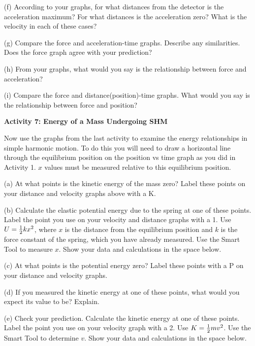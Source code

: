 (f) According to your graphs, for what distances from the detector is the acceleration
maximum? For what distances is the acceleration zero? What is the velocity in
each of these cases?
\vspace{20mm}

(g) Compare the force and acceleration-time graphs. Describe any similarities.
Does the force graph agree with your prediction?
\vspace{20mm}

(h) From your graphs, what would you say is the relationship between force and
acceleration? 
\vspace{20mm}

(i) Compare the force and distance(position)-time graphs. What would you say
is the relationship between force and position? 
\vspace{20mm}

\textbf{Activity 7: Energy of a Mass Undergoing SHM }

Now use the graphs from the last activity to examine the energy relationships
in simple harmonic motion. To do this you will need to draw a horizontal line through the equilibrium position on the position vs time graph as you did in Activity 1. $x$ values must be measured relative to this equilibrium position.

(a) At what points is the kinetic energy of the mass zero? Label these points
on your distance and velocity graphs above with a K.

(b) Calculate the elastic potential energy due to the spring at one of these
points. Label the point you use on your velocity and distance graphs with a
1. Use $U = {1\over 2}kx^{2}$, where 
$x$ is the distance from the equilibrium position
and $k$ is the force constant of the spring, 
which you have already measured. Use
the Smart Tool to measure $x$. Show your data and calculations in the space below. 
\vspace{20mm}

(c) At what points is the potential energy zero? Label these points with a P
on your distance and velocity graphs.

(d) If you measured the kinetic energy at one of these points, what would you
expect its value to be? Explain.
\vspace{20mm}

(e) Check your prediction. Calculate the kinetic energy at one of these points.
Label the point you use on your velocity graph with a 2. Use 
$K = {1\over 2} mv^{2}$.
Use the Smart Tool to determine $v$. Show your data and calculations in the space
below.
\vspace{20mm}

